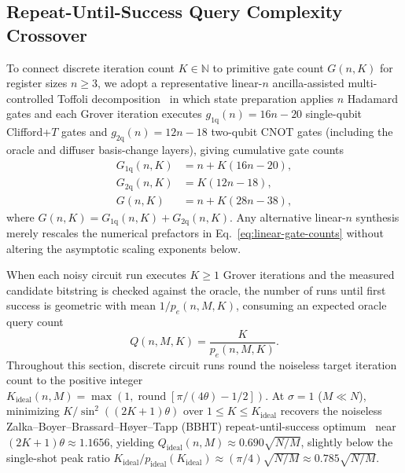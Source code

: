 

\subsection{Repeat-Until-Success Query Complexity Crossover}
\label{sec:query-crossover}

To connect discrete iteration count $K \in \mathbb{N}$ to primitive gate count $G(n, K)$ for register sizes $n \ge 3$, we adopt a representative linear-$n$ ancilla-assisted multi-controlled Toffoli decomposition~\cite{Barenco1995,Maslov2016} in which state preparation applies $n$ Hadamard gates and each Grover iteration executes $g_{1\mathrm{q}}(n) = 16n - 20$ single-qubit Clifford+$T$ gates and $g_{2\mathrm{q}}(n) = 12n - 18$ two-qubit $\mathrm{CNOT}$ gates (including the oracle and diffuser basis-change layers), giving cumulative gate counts
\begin{align}
G_{1\mathrm{q}}(n, K) &= n + K(16n - 20), \nonumber \\
G_{2\mathrm{q}}(n, K) &= K(12n - 18), \nonumber \\
G(n, K) &= n + K(28n - 38),
\label{eq:linear-gate-counts}
\end{align}
where $G(n, K) = G_{1\mathrm{q}}(n, K) + G_{2\mathrm{q}}(n, K)$. Any alternative linear-$n$ synthesis merely rescales the numerical prefactors in Eq.~\eqref{eq:linear-gate-counts} without altering the asymptotic scaling exponents below.

When each noisy circuit run executes $K \ge 1$ Grover iterations and the measured candidate bitstring is checked against the oracle, the number of runs until first success is geometric with mean $1/p_e(n, M, K)$, consuming an expected oracle query count
\begin{equation}
Q(n, M, K) = \frac{K}{p_e(n, M, K)}.
\label{eq:query-functional}
\end{equation}
Throughout this section, discrete circuit runs round the noiseless target iteration count to the positive integer $K_{\mathrm{ideal}}(n, M) = \max(1, \operatorname{round}[\pi/(4\theta) - 1/2])$. At $\sigma = 1$ ($M \ll N$), minimizing $K / \sin^2((2K + 1)\theta)$ over $1 \le K \le K_{\mathrm{ideal}}$ recovers the noiseless Zalka--Boyer--Brassard--H{\o}yer--Tapp (BBHT) repeat-until-success optimum~\cite{Boyer1998,Zalka1999} near $(2K + 1)\theta \approx 1.1656$, yielding $Q_{\mathrm{ideal}}(n, M) \approx 0.690\sqrt{N/M}$, slightly below the single-shot peak ratio $K_{\mathrm{ideal}} / p_{\mathrm{ideal}}(K_{\mathrm{ideal}}) \approx (\pi/4)\sqrt{N/M} \approx 0.785\sqrt{N/M}$.

